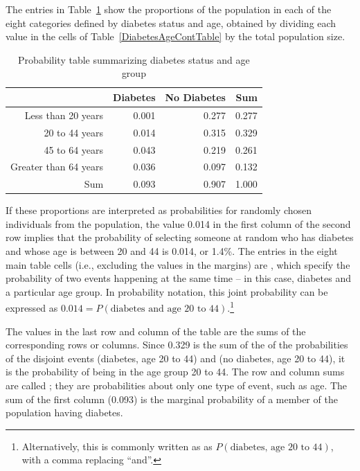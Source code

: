 The entries in Table~\ref{DiabetesAgeProbTable} show the proportions of the population in each of the eight categories defined by diabetes status and age, obtained by dividing each value in the cells of Table~\ref{DiabetesAgeContTable} by the total population size.


\begin{table}[ht]
	\centering
	\begin{tabular}{rrrr}
		\hline
		& Diabetes & No Diabetes & Sum \\ 
		\hline
		Less than 20 years & 0.001 & 0.277 & 0.277 \\ 
		20 to 44 years & 0.014 & 0.315 & 0.329 \\ 
		45 to 64 years & 0.043 & 0.219 & 0.261 \\ 
		Greater than 64 years & 0.036 & 0.097 & 0.132 \\ 
		Sum & 0.093 & 0.907 & 1.000 \\ 
		\hline
	\end{tabular}
	\caption{Probability table summarizing diabetes status and age group}
	\label{DiabetesAgeProbTable}
\end{table}

If these proportions are interpreted as probabilities for randomly chosen individuals from the population, the value 0.014 in the first column of the second row implies that the probability of selecting someone at random who has diabetes and whose age is between 20 and 44 is 0.014, or 1.4\%. The entries in the eight main table cells (i.e., excluding the values in the margins) are , which specify the probability of two events happening at the same time -- in this case, diabetes and a particular age group. In probability notation, this joint probability can be expressed as $0.014 = P(\text{diabetes and age 20 to 44})$.\footnote{Alternatively, this is commonly written as as $P(\text{diabetes, age 20 to 44})$, with a comma replacing ``and''.}

The values in the last row and column of the table are the sums of the corresponding rows or columns. Since 0.329 is the sum of the of the probabilities of the disjoint events (diabetes, age 20 to 44) and (no diabetes, age 20 to 44), it is the probability of being in the age group 20 to 44. The row and column sums are called ; they are probabilities about only one type of event, such as age. The sum of the first column (0.093) is the marginal probability of a member of the population having diabetes.

